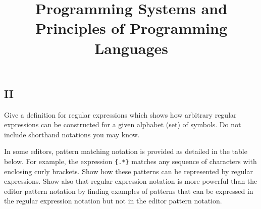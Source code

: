 
\begin{preamble}
\part{II}
\title{Programming Systems and Principles of Programming Languages}
\end{preamble}

\begin{questions}


\newenvironment{bnf}{
    \begin{tabbing}
    XXXXXX \= XXXX \= XXXXXXXXXXXXXXXXXXXXXXXXXXXXXXXXXX\kill}{
    \end{tabbing}
    }

\newcommand{\nt}[1]{{\it #1\/}}
\newcommand{\Or}[1]{\ \ $|$ \ \ #1}
\newcommand{\Rule}[2]{{\it #1} \> $\rightarrow$ \> #2}

\question

\begin{subquestions}

\subquestion

Give a definition for regular expressions which shows how
arbitrary regular expressions can be constructed for a
given alphabet (set) of symbols. Do not include shorthand
notations you may know.

\subquestion
        In some editors, pattern matching notation is
        provided as detailed in the table below.
        For example, the expression \verb"{.*}" 
        matches any sequence of characters with enclosing
        curly brackets.
        Show how these patterns can be represented by regular
        expressions. Show also that regular expression notation is
        more powerful than the editor pattern notation by
        finding examples of patterns that can be expressed in the
        regular expression notation but not in the editor pattern
        notation.



\end{subquestions}
\end{questions}

